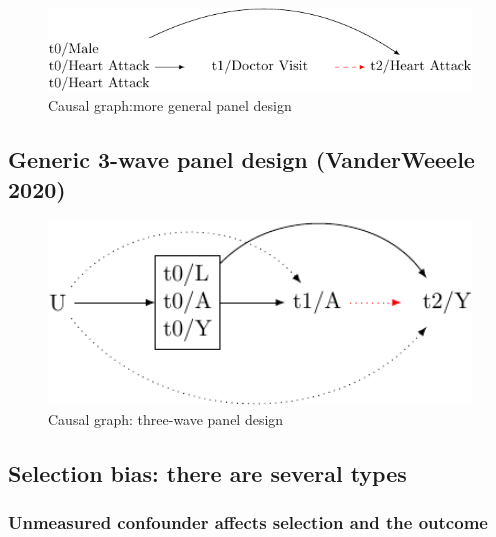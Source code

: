 \documentclass[
  singlecolumn]{report}
\begin{document}
\begin{figure}

{\centering \includegraphics[width=1\textwidth,height=\textheight]{causal-dags_files/figure-pdf/fig-dag-5-1.pdf}

}

\caption{\label{fig-dag-5}Causal graph:more general panel design}

\end{figure}

\hypertarget{generic-3-wave-panel-design-vanderweeele-2020}{%
\subsection{Generic 3-wave panel design (VanderWeeele
2020)}\label{generic-3-wave-panel-design-vanderweeele-2020}}

\begin{figure}

{\centering \includegraphics[width=1\textwidth,height=\textheight]{causal-dags_files/figure-pdf/fig-dag-6-1.pdf}

}

\caption{\label{fig-dag-6}Causal graph: three-wave panel design}

\end{figure}

\hypertarget{selection-bias-there-are-several-types}{%
\subsection{Selection bias: there are several
types}\label{selection-bias-there-are-several-types}}

\hypertarget{unmeasured-confounder-affects-selection-and-the-outcome}{%
\subsubsection{Unmeasured confounder affects selection and the
outcome}\label{unmeasured-confounder-affects-selection-and-the-outcome}}
\end{document}
